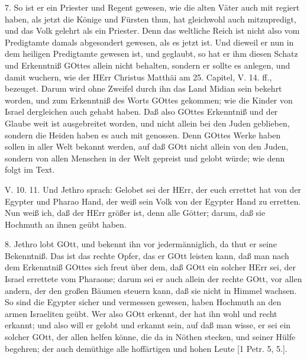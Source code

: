 7. So ist er ein Priester und Regent gewesen, wie die alten Väter auch mit regiert haben, als jetzt die Könige und Fürsten thun, hat gleichwohl auch mitzupredigt, und das Volk gelehrt als ein Priester. Denn das weltliche Reich ist nicht also vom Predigtamte damals abgesondert gewesen, als es jetzt ist. Und dieweil er nun in dem heiligen Predigtamte gewesen ist, und geglaubt, so hat er ihm diesen Schatz und Erkenntniß GOttes allein nicht behalten, sondern er sollte es anlegen, und damit wuchern, wie der HErr Christus Matthäi am 25. Capitel, V. 14. ff., bezeuget. Darum wird ohne Zweifel durch ihn das Land Midian sein bekehrt worden, und zum Erkenntniß des Worts GOttes gekommen; wie die Kinder von Israel dergleichen auch gehabt haben. Daß also GOttes Erkenntniß und der Glaube weit ist ausgebreitet worden, und nicht allein bei den Juden geblieben, sondern die Heiden haben es auch mit genossen. Denn GOttes Werke haben sollen in aller Welt bekannt werden, auf daß GOtt nicht allein von den Juden, sondern von allen Menschen in der Welt gepreist und gelobt würde; wie denn folgt im Text.

\begin{schriftzitat}
V. 10. 11. Und Jethro sprach: Gelobet sei der HErr, der euch errettet hat von der Egypter und Pharao Hand, der weiß sein Volk von der Egypter Hand zu erretten. Nun weiß ich, daß der HErr größer ist, denn alle Götter; darum, daß sie Hochmuth an ihnen geübt haben.
\end{schriftzitat}

8. Jethro lobt GOtt, und bekennt ihn vor jedermänniglich, da thut er seine Bekenntniß. Das ist das rechte Opfer, das er GOtt leisten kann, daß man nach dem Erkenntniß GOttes sich freut über dem, daß GOtt ein solcher HErr sei, der Israel errettete vom Pharaone; darum sei er auch allein der rechte GOtt, vor allen andern, der den großen Bäumen steuern kann, daß sie nicht in Himmel wachsen. So sind die Egypter sicher und vermessen gewesen, haben Hochmuth an den armen Israeliten geübt. Wer also GOtt erkennt, der hat ihn wohl und recht erkannt; und also will er gelobt und erkannt sein, auf daß man wisse, er sei ein solcher GOtt, der allen helfen könne, die da in Nöthen stecken, und seiner Hülfe begehren; der auch demüthige alle hoffärtigen und hohen Leute [1 Petr. 5, 5.].

